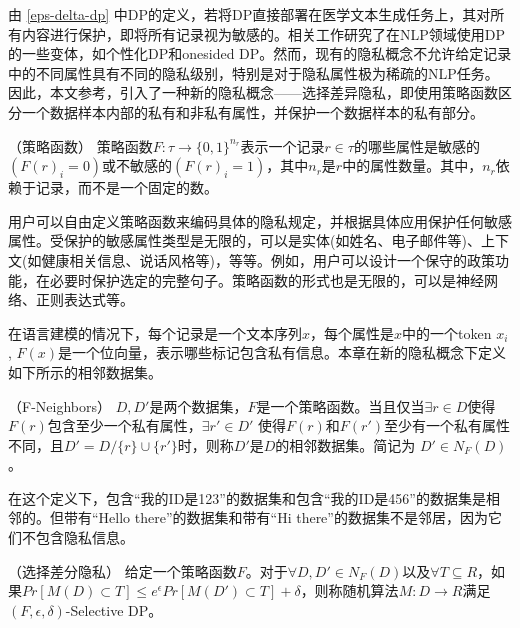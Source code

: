 由 \ref{eps-delta-dp} 中DP的定义，若将DP直接部署在医学文本生成任务上，其对所有内容进行保护，即将所有记录视为敏感的。相关工作研究了在NLP领域使用DP的一些变体，如个性化DP\cite{DP_Personal}和onesided DP\cite{onesideDP}。然而，现有的隐私概念不允许给定记录中的不同属性具有不同的隐私级别，特别是对于隐私属性极为稀疏的NLP任务。因此，本文参考\cite{selectivedp}，引入了一种新的隐私概念——选择差异隐私，即使用策略函数区分一个数据样本内部的私有和非私有属性，并保护一个数据样本的私有部分。


\begin{definition}{（策略函数）}
	策略函数$F: τ\rightarrow\{0,1\}^{n_r}$表示一个记录$r∈τ$的哪些属性是敏感的$(F(r)_i=0)$或不敏感的$(F(r)_i=1)$，其中$n_r$是$r$中的属性数量。其中，$n_r$依赖于记录，而不是一个固定的数。
	\label{metric_func}
\end{definition}


用户可以自由定义策略函数来编码具体的隐私规定，并根据具体应用保护任何敏感属性。受保护的敏感属性类型是无限的，可以是实体(如姓名、电子邮件等)、上下文(如健康相关信息、说话风格等)，等等。例如，用户可以设计一个保守的政策功能，在必要时保护选定的完整句子。策略函数的形式也是无限的，可以是神经网络、正则表达式等。

在语言建模的情况下，每个记录是一个文本序列$x$，每个属性是$x$中的一个token $x_i$, $F(x)$是一个位向量，表示哪些标记包含私有信息。本章在新的隐私概念下定义如下所示的相邻数据集。

\begin{definition}{（F-Neighbors）}
	$D, D'$是两个数据集，$F$是一个策略函数。当且仅当$∃r∈D$使得$F(r)$包含至少一个私有属性，$∃r'∈D'$ 使得$F(r)$和$F(r')$至少有一个私有属性不同，且$D'=D/\{r\}∪\{ r'\}$时，则称$D'$是$D$的相邻数据集。简记为 $D'∈N_F (D)$。
	\label{F_Neighbour}
\end{definition}

在这个定义下，包含“我的ID是123”的数据集和包含“我的ID是456”的数据集是相邻的。但带有“Hello there”的数据集和带有“Hi there”的数据集不是邻居，因为它们不包含隐私信息。

\begin{definition}{（选择差分隐私\cite{selectivedp}）}
给定一个策略函数$F$。对于$∀D, D'\in N_F (D)$以及$∀T⊆R$，如果$Pr[M(D)\subset T]\leq e^\epsilon Pr[M(D')\subset T]+\delta$，则称随机算法$M:D\rightarrow R$满足$(F,\epsilon,\delta)$-Selective DP。
\label{SDP}
\end{definition}

